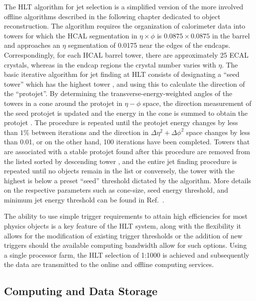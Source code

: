 The HLT algorithm for jet selection is a simplified version of the more involved offline algorithms described in the following chapter dedicated to object reconstruction. The algorithm requires the organization of calorimeter data into towers for which the HCAL segmentation in $\eta \times \phi$ is $0.0875\times 0.0875$ in the barrel and approaches an $\eta$ segmentation of 0.0175 near the edges of the endcaps. Correspondingly, for each HCAL barrel tower, there are approximately 25 ECAL crystals, whereas in the endcap regions the crystal number varies with $\eta$. The basic iterative algorithm for jet finding at HLT consists of designating a ``seed tower'' which has the highest tower \Et, and using this to calculate the direction of the ``protojet''. By determining the transverse-energy-weighted angles of the towers in a cone around the protojet in $\eta-\phi$ space, the direction measurement of the seed protojet is updated and the energy in the cone is summed to obtain the protojet \Et. The procedure is repeated until the protojet energy changes by less than $1\%$ between iterations and the direction in $\Delta\eta^2+\Delta\phi^2$ space changes by less than 0.01, or on the other hand, 100 iterations have been completed. Towers that are associated with a stable protojet found after this procedure are removed from the listed sorted by descending tower \Et, and the entire jet finding procedure is repeated until no objects remain in the list or conversely, the tower with the highest \Et is below a preset ``seed'' threshold dictated by the algorithm. More details on the respective parameters such as cone-size, seed energy threshold, and minimum jet energy threshold can be found in Ref.~\cite{Cittolin:578006}.

The ability to use simple trigger requirements to attain high efficiencies for most physics objects is a key feature of the HLT system, along with the flexibility it allows for the modification of existing trigger thresholds or the addition of new triggers should the available computing bandwidth allow for such options. Using a single processor farm, the HLT selection of 1:1000 is achieved and subsequently the data are transmitted to the online and offline computing services.

\subsection{Computing and Data Storage}
\label{subsec:computing}


